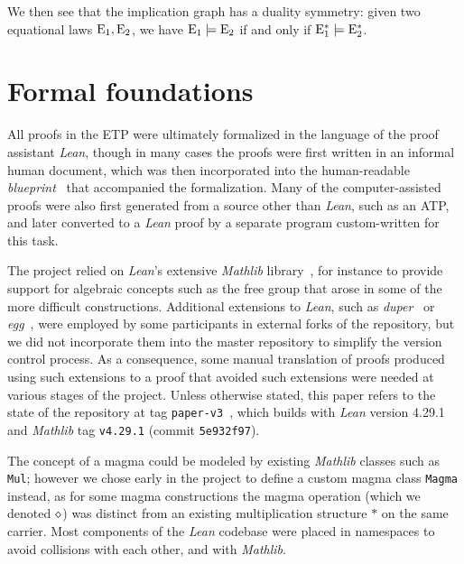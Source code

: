 We then see that the implication graph has a duality symmetry: given two equational laws $\mathrm{E}_1,\mathrm{E}_2$, we have $\mathrm{E}_1 \models \mathrm{E}_2$ if and only if $\mathrm{E}_1^* \models \mathrm{E}_2^*$.

\section{Formal foundations}


All proofs in the ETP were ultimately formalized in the language of the proof assistant \emph{Lean}, though in many cases the proofs were first written in an informal human document, which was then incorporated into the human-readable \emph{blueprint}~\cite{leanblueprint} that accompanied the formalization.  Many of the computer-assisted proofs were also first generated from a source other than \emph{Lean}, such as an ATP, and later converted to a \emph{Lean} proof by a separate program custom-written for this task.

The project relied on \emph{Lean}'s extensive \emph{Mathlib} library~\cite{mathlib2020}, for instance to provide support for algebraic concepts such as the free group that arose in some of the more difficult constructions.  Additional extensions to \emph{Lean}, such as \emph{duper}~\cite{DBLP:conf/itp/CluneQBA24} or \emph{egg}~\cite{egg_tactic}, were employed by some participants in external forks of the repository, but we did not incorporate them into the master repository to simplify the version control process.  As a consequence, some manual translation of proofs produced using such extensions to a proof that avoided such extensions were needed at various stages of the project.  Unless otherwise stated, this paper refers to the state of the repository at tag \texttt{paper-v3}~\cite{The_Equational_Theories_repository}, which builds with \emph{Lean} version 4.29.1 and \emph{Mathlib} tag \texttt{v4.29.1} (commit \texttt{5e932f97}).

The concept of a magma could be modeled by existing \emph{Mathlib} classes such as \texttt{Mul}; however we chose early in the project to define a custom magma class \texttt{Magma} instead, as for some magma constructions the magma operation (which we denoted $\diamond$) was distinct from an existing multiplication structure $*$ on the same carrier.  Most components of the \emph{Lean} codebase were placed in namespaces to avoid collisions with each other, and with \emph{Mathlib}.

